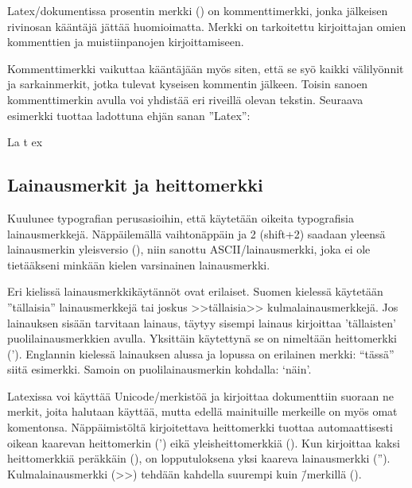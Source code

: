 Latex\-/dokumentissa prosentin merkki (\koodi{\%}) on kommenttimerkki,
jonka jälkeisen rivin\-osan kääntäjä jättää huomioimatta. Merkki on
tarkoitettu kirjoittajan omien kommenttien ja muistiinpanojen
kirjoittamiseen.

\begin{koodilohkosis}
\end{koodilohkosis}

Kommenttimerkki vaikuttaa kääntäjään myös siten, että se syö kaikki
välilyönnit ja sarkainmerkit, jotka tulevat kyseisen kommentin jälkeen.
Toisin sanoen kommenttimerkin avulla voi yhdistää eri riveillä olevan
tekstin. Seuraava esimerkki tuottaa ladottuna ehjän sanan ''Latex'':

\begin{koodilohkosis}
  La%
    t%
      ex
\end{koodilohkosis}

\subsection{Lainausmerkit ja heittomerkki}

Kuulunee typo\-grafian perus\-asioihin, että käytetään oikeita
typo\-grafisia lainausmerkkejä. Näppäilemällä vaihtonäppäin ja 2
(shift+2) saadaan yleensä lainausmerkin yleisversio (\textquotedbl),
niin sanottu ASCII\-/lainausmerkki, joka ei ole tietääkseni minkään
kielen varsinainen lainausmerkki.

Eri kielissä lainausmerkkikäytännöt ovat erilaiset. Suomen kielessä
käytetään ''tällaisia'' lainausmerkkejä tai joskus >>tällaisia>>
kulmalainausmerkkejä. Jos lainauksen sisään tarvitaan lainaus, täytyy
sisempi lainaus kirjoittaa 'tällaisten' puolilainausmerkkien avulla.
Yksittäin käytettynä se on nimeltään heittomerkki ('). Englannin
kielessä lainauksen alussa ja lopussa on erilainen merkki: ``tässä''
siitä esimerkki. Samoin on puolilainausmerkin kohdalla: `näin'.

Latexissa voi käyttää Unicode\-/merkistöä ja kirjoittaa dokumenttiin
suoraan ne merkit, joita halutaan käyttää, mutta edellä mainituille
merkeille on myös omat komentonsa. Näppäimistöltä kirjoitettava
heittomerkki tuottaa automaattisesti oikean kaarevan heittomerkin (')
eikä yleisheittomerkkiä (). Kun kirjoittaa kaksi heittomerkkiä
peräkkäin (), on lopputuloksena yksi kaareva lainausmerkki
(''). Kulmalainausmerkki (>>) tehdään kahdella suurempi kuin \=/merkillä
(\koodi{>>}).

